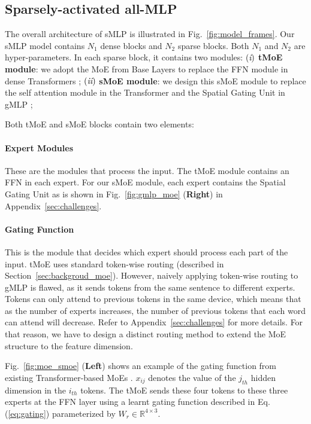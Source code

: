 \documentclass{article}
\newcommand{\RRN}[1]{\textup{\lowercase\expandafter{\it \romannumeral#1}}}
\begin{document}
\subsection{Sparsely-activated all-MLP}
\label{sec:sparse_mlp}
 
The overall architecture of sMLP is illustrated in Fig.~\ref{fig:model_frames}. Our sMLP model contains $N_1$ dense blocks and $N_2$ sparse blocks. Both $N_1$ and $N_2$ are hyper-parameters. In each sparse block, it contains two modules: 
$(\RRN{1})$ \textbf{tMoE module}: we adopt the MoE from Base Layers \citep{baselayer} to replace the FFN module in dense Transformers \citep{vaswani2017attention}; 
$(\RRN{2})$ \textbf{sMoE module}: we design this sMoE module to replace the self attention module in the Transformer \citep{vaswani2017attention} and the Spatial Gating Unit in gMLP \citep{gmlp};

Both tMoE and sMoE blocks contain two elements: \paragraph{Expert Modules} These are the modules that process the input.
The tMoE module contains an FFN in each expert. For our sMoE module, each expert contains the Spatial Gating Unit as is shown in Fig.~\ref{fig:gmlp_moe} (\textbf{Right}) in Appendix~\ref{sec:challenges}. 

\paragraph{Gating Function}
This is the module that decides which expert should process each part of the input. tMoE uses standard token-wise routing (described in Section~\ref{sec:backgroud_moe}). However, naively applying token-wise routing to gMLP is flawed, as it sends tokens from the same sentence to different experts. Tokens can only attend to previous tokens in the same device, which means that as the number of experts increases, the number of previous tokens that each word can attend will decrease. Refer to Appendix~\ref{sec:challenges} for more details. For that reason, we have to design a distinct routing method to extend the MoE structure to the feature dimension. 





Fig.~\ref{fig:moe_smoe} (\textbf{Left}) shows an example of the gating function from existing Transformer-based MoEs \citep{gshard,switch,baselayer,hashlayer}. $x_{ij}$ denotes the value of the $j_{th}$ hidden dimension in the $i_{th}$ tokens. The tMoE sends these four tokens to these three experts at the FFN layer using a learnt gating function described in Eq.(\ref{eq:gating}) parameterized by $W_r \in \mathbb{R}^{4 \times 3}$.
\end{document}
